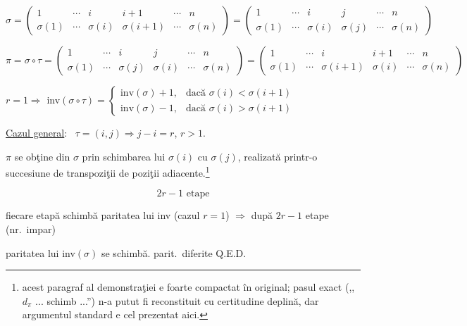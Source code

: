 \documentclass[12pt]{article}
\begin{document}
\[
\sigma = \begin{pmatrix}1&\cdots&i&i+1&\cdots&n\\ \sigma(1)&\cdots&\sigma(i)&\sigma(i+1)&\cdots&\sigma(n)\end{pmatrix}
= \begin{pmatrix}1&\cdots&i&j&\cdots&n\\ \sigma(1)&\cdots&\sigma(i)&\sigma(j)&\cdots&\sigma(n)\end{pmatrix}
\]

\[
\pi=\sigma\circ\tau = \begin{pmatrix}1&\cdots&i&j&\cdots&n\\ \sigma(1)&\cdots&\sigma(j)&\sigma(i)&\cdots&\sigma(n)\end{pmatrix}
= \begin{pmatrix}1&\cdots&i&i+1&\cdots&n\\ \sigma(1)&\cdots&\sigma(i+1)&\sigma(i)&\cdots&\sigma(n)\end{pmatrix}
\]

\bigskip
\noindent $r=1 \Rightarrow$ inv$(\sigma\circ\tau) =
\begin{cases}
\text{inv}(\sigma)+1, & \text{dacă } \sigma(i)<\sigma(i+1)\\
\text{inv}(\sigma)-1, & \text{dacă } \sigma(i)>\sigma(i+1)
\end{cases}$

\bigskip
\noindent\underline{Cazul general}: \ $\tau=(i,j) \Rightarrow j-i=r$, $r>1$.

\noindent $\pi$ se obţine din $\sigma$ prin schimbarea lui $\sigma(i)$ cu $\sigma(j)$, realizată printr-o succesiune de transpoziţii de poziţii adiacente.\footnote{acest paragraf al demonstraţiei e foarte compactat în original; pasul exact (,,$d_\pi$ ... schimb ...'') n-a putut fi reconstituit cu certitudine deplină, dar argumentul standard e cel prezentat aici.}

\[
2r-1 \text{ etape}
\]

\noindent fiecare etapă schimbă paritatea lui inv (cazul $r=1$) $\Rightarrow$ după $2r-1$ etape (nr.\ impar)

\noindent paritatea lui inv$(\sigma)$ se schimbă. \hfill parit.\ diferite \quad Q.E.D.
\end{document}
